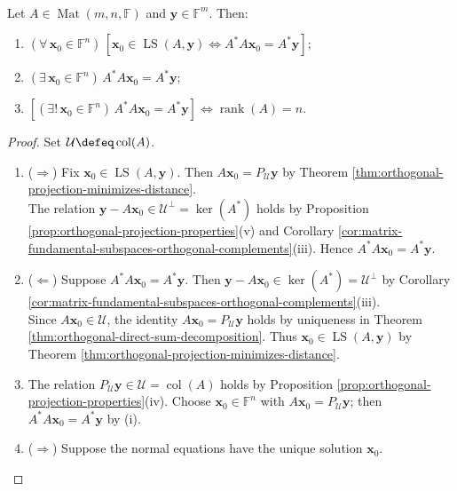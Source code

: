 \begin{theorem} \label{thm:matrix-least-squares-normal-equations} \\
Let $A\in\operatorname{Mat}(m,n,\mathbb{F})$ and $\mathbf{y}\in\mathbb{F}^m$. Then:
\begin{enumerate}[label=(\roman*)]
\setlength{\itemsep}{0pt}
\item $(\forall\,\mathbf{x}_0\in\mathbb{F}^n)\,[\mathbf{x}_0\in\operatorname{LS}(A,\mathbf{y})\Longleftrightarrow A^*A\mathbf{x}_0=A^*\mathbf{y}]$;
\item $(\exists\,\mathbf{x}_0\in\mathbb{F}^n)\,A^*A\mathbf{x}_0=A^*\mathbf{y}$;
\item $[(\exists!\,\mathbf{x}_0\in\mathbb{F}^n)\,A^*A\mathbf{x}_0=A^*\mathbf{y}]\Longleftrightarrow\operatorname{rank}(A)=n$.
\end{enumerate}
\begin{proof}
Set $\mathcal{U}\defeq\operatorname{col}(A)$.
\begin{enumerate}[label=(\roman*)]
\setlength{\itemsep}{0pt}
\item[$(i)$] ($\Rightarrow$) Fix $\mathbf{x}_0\in\operatorname{LS}(A,\mathbf{y})$. Then $A\mathbf{x}_0=P_{\mathcal{U}}\mathbf{y}$ by Theorem \ref{thm:orthogonal-projection-minimizes-distance}.\\
The relation $\mathbf{y}-A\mathbf{x}_0\in\mathcal{U}^{\perp}=\ker(A^*)$ holds by Proposition \ref{prop:orthogonal-projection-properties}(v) and Corollary \ref{cor:matrix-fundamental-subspaces-orthogonal-complements}(iii). Hence $A^*A\mathbf{x}_0=A^*\mathbf{y}$.
\item[$(i)$] ($\Leftarrow$) Suppose $A^*A\mathbf{x}_0=A^*\mathbf{y}$. Then $\mathbf{y}-A\mathbf{x}_0\in\ker(A^*)=\mathcal{U}^{\perp}$ by Corollary \ref{cor:matrix-fundamental-subspaces-orthogonal-complements}(iii).\\
Since $A\mathbf{x}_0\in\mathcal{U}$, the identity $A\mathbf{x}_0=P_{\mathcal{U}}\mathbf{y}$ holds by uniqueness in Theorem \ref{thm:orthogonal-direct-sum-decomposition}. Thus $\mathbf{x}_0\in\operatorname{LS}(A,\mathbf{y})$ by Theorem \ref{thm:orthogonal-projection-minimizes-distance}.
\item[$(ii)$] The relation $P_{\mathcal{U}}\mathbf{y}\in\mathcal{U}=\operatorname{col}(A)$ holds by Proposition \ref{prop:orthogonal-projection-properties}(iv). Choose $\mathbf{x}_0\in\mathbb{F}^n$ with $A\mathbf{x}_0=P_{\mathcal{U}}\mathbf{y}$; then $A^*A\mathbf{x}_0=A^*\mathbf{y}$ by (i).
\item[$(iii)$] ($\Rightarrow$) Suppose the normal equations have the unique solution $\mathbf{x}_0$.\\

\end{enumerate}
\end{proof}
\end{theorem}
